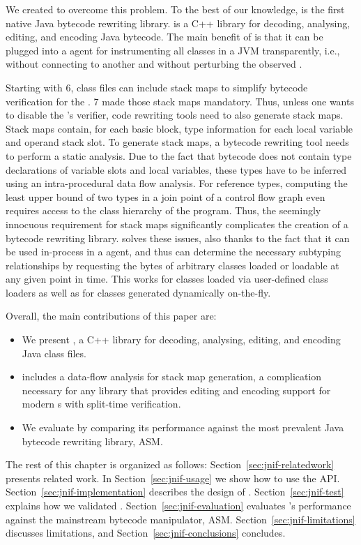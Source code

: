We created \jnif{} to overcome this problem. 
To the best of our knowledge, \jnif{} is the first native Java bytecode rewriting library.
\jnif{} is a C++ library for decoding, analysing, editing, and encoding Java bytecode.
The main benefit of \jnif{} is that it can be plugged into a \jvmti{} agent 
for instrumenting all classes in a JVM transparently, i.e., 
without connecting to another \jvm{} and without perturbing the observed \jvm{}.

Starting with \java{} 6, class files can include stack maps to
simplify bytecode verification for the \jvm{}.
\java{} 7 made those stack maps mandatory.
Thus, unless one wants to disable the \jvm{}'s verifier,
code rewriting tools need to also generate stack maps.
Stack maps contain, for each basic block,
type information for each local variable and operand stack slot.
To generate stack maps, a bytecode rewriting tool needs to perform a static analysis.
Due to the fact that bytecode does not contain type declarations of variable slots and local variables,
these types have to be inferred using an intra-procedural data flow analysis.
For reference types, 
computing the least upper bound of two types in a join point of a control flow graph 
even requires access to the class hierarchy of the program.
Thus, the seemingly innocuous requirement for stack maps
significantly complicates the creation of a bytecode rewriting library.
\jnif{} solves these issues, also thanks to the fact that it can be
used in-process in a \jvmti{} agent,
and thus can determine the necessary subtyping relationships 
by requesting the bytes of arbitrary classes loaded or loadable at any given point in time.
This works for classes loaded via user-defined class loaders as well as
for classes generated dynamically on-the-fly.

Overall, the main contributions of this paper are:

\begin{itemize}
	\item We present \jnif{}, a C++ library for decoding, analysing, editing, and encoding Java class files.
	\item \jnif{} includes a data-flow analysis for stack map generation, 
	      a complication necessary for any library that provides editing and encoding support for modern \jvm{}s with split-time verification.
	\item We evaluate \jnif{} by comparing its performance against the most prevalent Java bytecode rewriting library, ASM.
\end{itemize}

The rest of this chapter is organized as follows:
Section~\ref{sec:jnif-relatedwork} presents related work.
In Section~\ref{sec:jnif-usage} we show how to use the \jnif{} API.
Section~\ref{sec:jnif-implementation} describes the design of \jnif{}.
Section~\ref{sec:jnif-test} explains how we validated \jnif{}.
Section~\ref{sec:jnif-evaluation} evaluates \jnif{}'s performance against the mainstream bytecode manipulator, ASM.
Section~\ref{sec:jnif-limitations} discusses limitations, and 
Section~\ref{sec:jnif-conclusions} concludes.